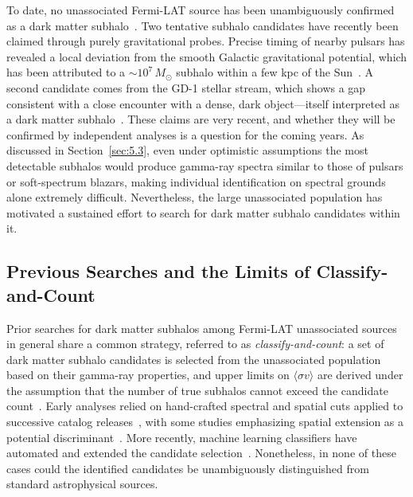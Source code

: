 To date, no unassociated Fermi-LAT source has been unambiguously confirmed as a dark matter subhalo~\cite{Fermi-LAT:2019yla,Fermi-LAT:2022byn,2015JCAP...12..035B,2019JCAP...07..020C}.
Two tentative subhalo candidates have recently been claimed through purely gravitational probes.
Precise timing of nearby pulsars has revealed a local deviation from the smooth Galactic gravitational potential, which has been attributed to a $\sim 10^{7}\,M_\odot$ subhalo within a few kpc of the Sun~\cite{Chakrabarti:2025hfk}.
A second candidate comes from the GD-1 stellar stream, which shows a gap consistent with a close encounter with a dense, dark object---itself interpreted as a dark matter subhalo~\cite{Zhang:2024fib}.
These claims are very recent, and whether they will be confirmed by independent analyses is a question for the coming years.
As discussed in Section~\ref{sec:5.3}, even under optimistic assumptions the most detectable subhalos would produce gamma-ray spectra similar to those of pulsars or soft-spectrum blazars, making individual identification on spectral grounds alone extremely difficult.
Nevertheless, the large unassociated population has motivated a sustained effort to search for dark matter subhalo candidates within it.

\subsection{Previous Searches and the Limits of Classify-and-Count}
\label{sec:5.4.2}
Prior searches for dark matter subhalos among Fermi-LAT unassociated sources in general share a common strategy, referred to as \textit{classify-and-count}: a set of dark matter subhalo candidates is selected from the unassociated population based on their gamma-ray properties, and upper limits on $\langle\sigma v\rangle$ are derived under the assumption that the number of true subhalos cannot exceed the candidate count~\DMsubhaloUnas.
Early analyses relied on hand-crafted spectral and spatial cuts applied to successive catalog releases~\cite{2010PhRvD..82f3501B,2012A&A...538A..93Z,2012ApJ...747..121A,2014PhRvD..89a6014B,2015JCAP...12..035B,2016JCAP...05..028S,2017JCAP...04..018H}, with some studies emphasizing spatial extension as a potential discriminant~\cite{2014PhRvD..89a6014B,2015JCAP...12..035B,2022PhRvD.105h3006C}.
More recently, machine learning classifiers have automated and extended the candidate selection~\DMsubhaloML.
Nonetheless, in none of these cases could the identified candidates be unambiguously distinguished from standard astrophysical sources.

